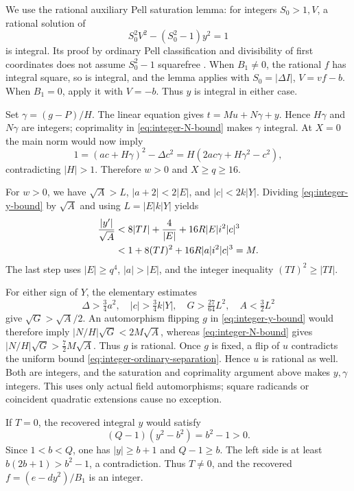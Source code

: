 We use the rational auxiliary Pell saturation lemma: for integers
$S_0>1,V$, a rational solution of
\begin{equation}\label{eq:integer-saturation}
 S_0^2V^2-(S_0^2-1)y^2=1
\end{equation}
is integral. Its proof by ordinary Pell classification and divisibility
of first coordinates does not assume $S_0^2-1$ squarefree
\cite{repo19}. When $B_1\ne0$, the rational $f$ has integral square,
so is integral, and the lemma applies with
$S_0=|\Delta I|$, $V=vf-b$. When $B_1=0$, apply it with $V=-b$.
Thus $y$ is integral in either case.

Set $\gamma=(g-P)/H$. The linear equation gives
$t=Mu+N\gamma+y$. Hence $H\gamma$ and $N\gamma$ are integers;
coprimality in \eqref{eq:integer-N-bound} makes $\gamma$ integral.
At $X=0$ the main norm would now imply
\[
 1=(ac+H\gamma)^2-\Delta c^2
   =H(2ac\gamma+H\gamma^2-c^2),
\]
contradicting $|H|>1$. Therefore $w>0$ and $X\geq q\geq16$.

For $w>0$, we have $\sqrt A>L$, $|a+2|<2|E|$, and
$|c|<2k|Y|$. Dividing \eqref{eq:integer-y-bound} by $\sqrt A$
and using $L=|E|k|Y|$ yields
\begin{align}
 \frac{|y'|}{\sqrt A}
 &<8|TI|+\frac4{|E|}+16R|E|i^2|c|^3\notag\\
 &<1+8(TI)^2+16R|a|i^2|c|^3=M.
 \label{eq:integer-ordinary-separation}
\end{align}
The last step uses $|E|\geq q^4$, $|a|>|E|$, and the integer
inequality $(TI)^2\geq|TI|$.

For either sign of $Y$, the elementary estimates
\[
 \Delta>\tfrac34a^2,\quad |c|>\tfrac34k|Y|,
 \quad G>\tfrac{27}{64}L^2,\quad A<\tfrac32L^2
\]
give $\sqrt G>\sqrt A/2$. An automorphism flipping $g$ in
\eqref{eq:integer-y-bound} would therefore imply
$|N/H|\sqrt G<2M\sqrt A$, whereas
\eqref{eq:integer-N-bound} gives
$|N/H|\sqrt G>\tfrac72M\sqrt A$. Thus $g$ is rational. Once $g$
is fixed, a flip of $u$ contradicts the uniform bound
\eqref{eq:integer-ordinary-separation}. Hence $u$ is rational as well.
Both are integers, and the saturation and coprimality argument above
makes $y,\gamma$ integers. This uses only actual field automorphisms;
square radicands or coincident quadratic extensions cause no exception.

If $T=0$, the recovered integral $y$ would satisfy
\[
 (Q-1)(y^2-b^2)=b^2-1>0.
\]
Since $1<b<Q$, one has $|y|\geq b+1$ and $Q-1\geq b$. The left
side is at least $b(2b+1)>b^2-1$, a contradiction. Thus $T\ne0$,
and the recovered $f=(e-dy^2)/B_1$ is an integer.

